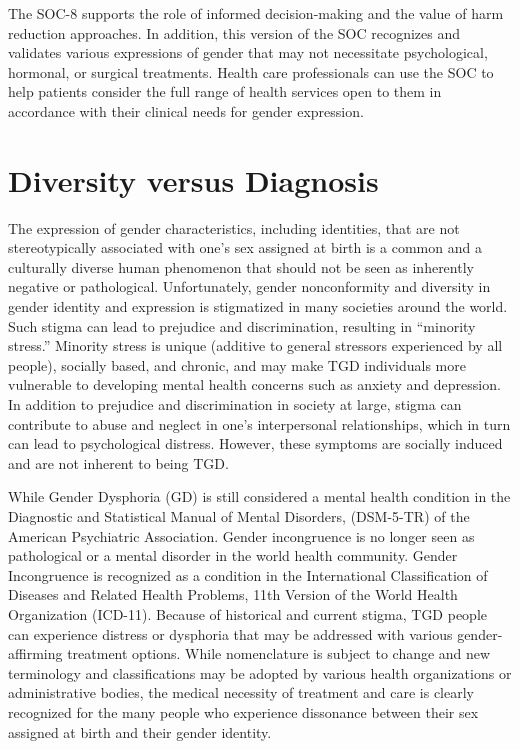 \documentclass[
]{book}
\begin{document}
The SOC-8 supports the role of informed
decision-making and the value of harm reduction
approaches. In addition, this version of the SOC
recognizes and validates various expressions of
gender that may not necessitate psychological,
hormonal, or surgical treatments. Health care
professionals can use the SOC to help patients
consider the full range of health services open
to them in accordance with their clinical needs
for gender expression.

\hypertarget{diversity-versus-diagnosis}{%
\section*{Diversity versus Diagnosis}\label{diversity-versus-diagnosis}}

The expression of gender characteristics, including identities, that are not stereotypically associated with one's sex assigned at birth is a common
and a culturally diverse human phenomenon that
should not be seen as inherently negative or
pathological. Unfortunately, gender nonconformity and diversity in gender identity and expression is stigmatized in many societies around the
world. Such stigma can lead to prejudice and
discrimination, resulting in ``minority stress.''
Minority stress is unique (additive to general
stressors experienced by all people), socially
based, and chronic, and may make TGD individuals more vulnerable to developing mental health
concerns such as anxiety and depression. In addition to prejudice and discrimination in society
at large, stigma can contribute to abuse and
neglect in one's interpersonal relationships, which
in turn can lead to psychological distress.
However, these symptoms are socially induced
and are not inherent to being TGD.

While Gender Dysphoria (GD) is still considered a mental health condition in the Diagnostic
and Statistical Manual of Mental Disorders,
(DSM-5-TR) of the American Psychiatric
Association. Gender incongruence is no longer
seen as pathological or a mental disorder in the
world health community. Gender Incongruence
is recognized as a condition in the International
Classification of Diseases and Related Health
Problems, 11th Version of the World Health
Organization (ICD-11). Because of historical and
current stigma, TGD people can experience distress or dysphoria that may be addressed with
various gender-affirming treatment options. While
nomenclature is subject to change and new terminology and classifications may be adopted by
various health organizations or administrative
bodies, the medical necessity of treatment and
care is clearly recognized for the many people
who experience dissonance between their sex
assigned at birth and their gender identity.
\end{document}
